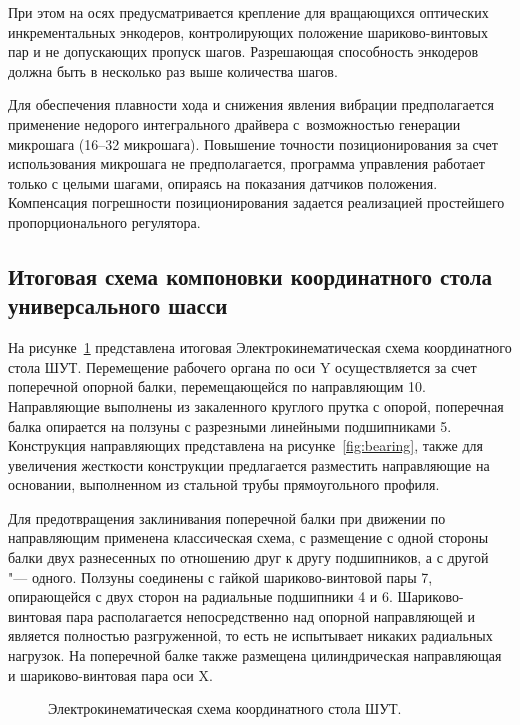 При этом на осях предусматривается крепление для вращающихся оптических инкрементальных энкодеров, контролирующих положение шариково-винтовых пар и не допускающих пропуск шагов. Разрешающая способность энкодеров должна быть в несколько раз выше количества шагов.

Для обеспечения плавности хода и снижения явления вибрации предполагается применение недорого интегрального драйвера с~возможностью генерации микрошага (16--32 микрошага). Повышение точности позиционирования за счет использования микрошага не предполагается, программа управления работает только с целыми шагами, опираясь на показания датчиков положения. Компенсация погрешности позиционирования задается реализацией простейшего пропорционального регулятора.

\subsection{Итоговая схема компоновки координатного стола универсального шасси}

На рисунке~\cref{fig:scheme} представлена итоговая Электрокинематическая схема координатного стола ШУТ. Перемещение рабочего органа по оси Y осуществляется за счет поперечной опорной балки, перемещающейся по направляющим 10. Направляющие выполнены из закаленного круглого прутка с опорой, поперечная балка опирается на ползуны с разрезными линейными подшипниками 5. Конструкция направляющих представлена на рисунке~\cref{fig:bearing}, также для увеличения жесткости конструкции предлагается разместить направляющие на основании, выполненном из стальной трубы прямоугольного профиля.

Для предотвращения заклинивания поперечной балки при движении по направляющим применена классическая схема, с размещение с одной стороны балки двух разнесенных по отношению друг к другу подшипников, а с другой "--- одного. Ползуны соединены с гайкой шариково-винтовой пары 7, опирающейся с двух сторон на радиальные подшипники 4 и 6. Шариково-винтовая пара располагается непосредственно над опорной направляющей и является полностью разгруженной, то есть не испытывает никаких радиальных нагрузок. На поперечной балке также размещена цилиндрическая направляющая и шариково-винтовая пара оси X.

\begin{figure}[ht]
	\caption{Электрокинематическая схема координатного стола ШУТ.}\label{fig:scheme}
\end{figure}


